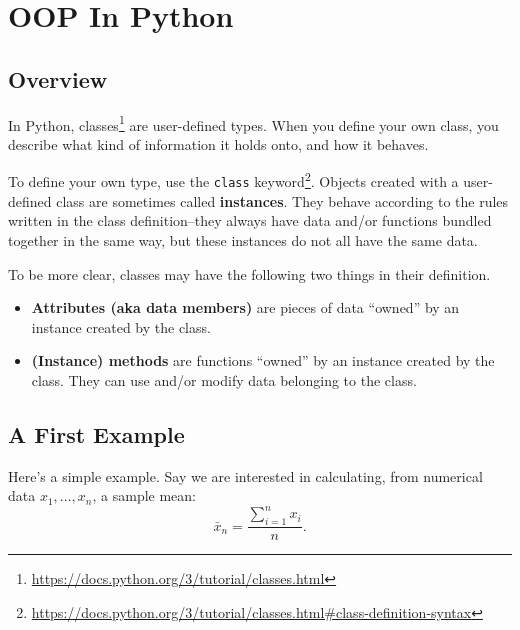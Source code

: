 \documentclass[
  12pt,
  krantz2]{krantz}
\renewcommand{\href}[2]{#2\footnote{\url{#1}}}
\begin{document}
\hypertarget{oop-in-python}{%
\section{OOP In Python}\label{oop-in-python}}

\hypertarget{overview}{%
\subsection{Overview}\label{overview}}

In Python, \href{https://docs.python.org/3/tutorial/classes.html}{classes} are user-defined types. When you define your own class, you describe what kind of information it holds onto, and how it behaves.

To define your own type, use the \href{https://docs.python.org/3/tutorial/classes.html\#class-definition-syntax}{\texttt{class} keyword}. Objects created with a user-defined class are sometimes called \textbf{instances}. They behave according to the rules written in the class definition--they always have data and/or functions bundled together in the same way, but these instances do not all have the same data.

To be more clear, classes may have the following two things in their definition.

\begin{itemize}
\item
  \textbf{Attributes (aka data members)} are pieces of data ``owned'' by an instance created by the class.
\item
  \textbf{(Instance) methods} are functions ``owned'' by an instance created by the class. They can use and/or modify data belonging to the class.
\end{itemize}

\hypertarget{a-first-example}{%
\subsection{A First Example}\label{a-first-example}}

Here's a simple example. Say we are interested in calculating, from numerical data \(x_1, \ldots, x_n\), a sample mean:
\begin{equation} 
\bar{x}_n = \frac{\sum_{i=1}^n x_i}{n}.
\end{equation}
\end{document}
